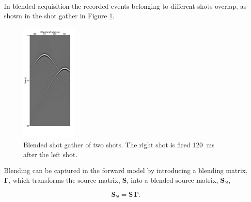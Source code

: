 In blended acquisition the recorded events belonging to different shots overlap, as shown in the shot gather in Figure \ref{fig:Ch-Theory-BlendedData}. 

\begin{figure}
	\centering
	\includegraphics[width=0.25\textwidth]{Plots/Mahdad/30iter/BlendedCSG_sh1-edit_copy}
	\caption{Blended shot gather of two shots. The right shot is fired \SI{120}{\milli\second} after the left shot.}
	\label{fig:Ch-Theory-BlendedData}
\end{figure}

Blending can be captured in the forward model by introducing a blending matrix, $\mathbf{\Gamma}$, which transforms the source matrix, $\mathbf{S}$, into a blended source matrix, $\mathbf{S}_{bl}$,

\begin{equation}
	\mathbf{S}_{bl} = \mathbf{S \, \Gamma}.
	\label{eq:Ch-Theory-BlendedSource}
\end{equation}


